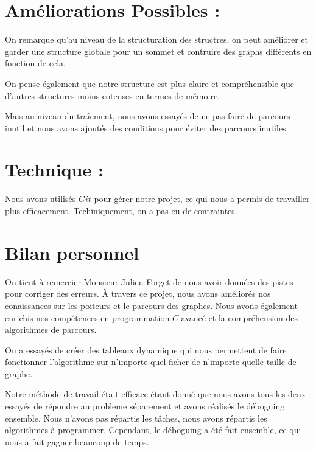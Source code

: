 \documentclass[11pt, a4paper]{report}
\begin{document}
	

	\chapter{Améliorations Possibles :}

	On remarque qu'au niveau de la structuration des structres, on peut améliorer et garder une structure globale pour un sommet et contruire des graphs différents en fonction de cela.

	On pense également que notre structure est plus claire et compréhensible que d'autres structures moins coteuses en termes de mémoire.

	Mais au niveau du traîement, nous avons essayés de ne pas faire de parcours inutil et nous avons ajoutés des conditions pour éviter des parcours inutiles.



	 \chapter{Technique :}

	 Nous avons utilisés $Git$ pour gérer notre projet, ce qui nous a permis de travailler plus efficacement. Techiniquement, on a pas eu de contraintes.

	\chapter*{Bilan personnel}
	
	On tient à remercier Monsieur Julien Forget de nous avoir données des pistes pour corriger des erreurs. À travers ce projet, nous avons améliorés nos conaissances sur les poiteurs et le parcours des graphes. Nous avons également enrichis nos compétences en programmation $C$ avancé et la compréhension des algorithmes de parcours.
	
	On a essayés de créer des tableaux dynamique qui nous permettent de faire fonctionner l'algorithme sur n'importe quel ficher de n'importe quelle taille de graphe.
	
	Notre méthode de travail était efficace étant donné que nous avons tous les deux essayés de répondre au probleme séparement et avons réalisés le déboguing ensemble. Nous n'avons pas répartis les tâches, nous avons répartis les algorithmes à programmer. Cependant, le déboguing a été fait ensemble, ce qui nous a fait gagner beaucoup de temps.
\end{document}
